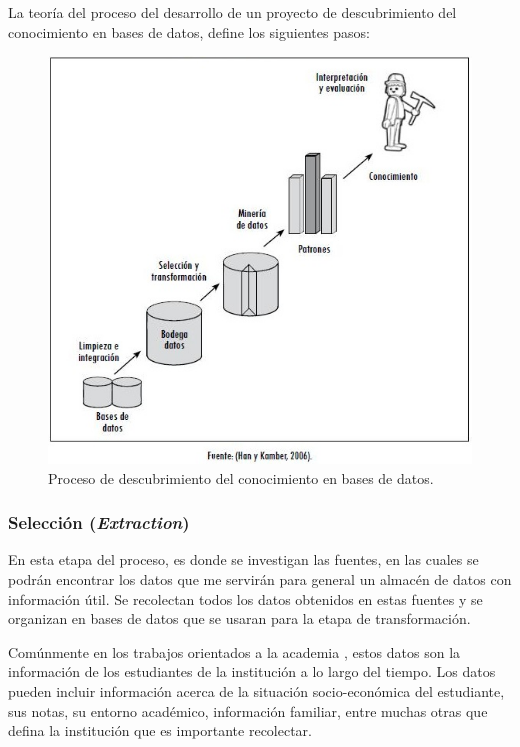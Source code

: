La teoría del proceso del desarrollo de un proyecto de descubrimiento del conocimiento en bases de datos, define los siguientes pasos:
\begin{figure}[H]
\begin{centering}
\includegraphics[scale=0.5]{v13n1a07-3}
\par\end{centering}
\caption{Proceso de descubrimiento del conocimiento en bases de datos.}
\end{figure}
\subsubsection{Selección (\emph{Extraction}) \cite{key-50,key-100}}
En esta etapa del proceso, es donde se investigan las fuentes, en las cuales se podrán encontrar los datos que me servirán para general un almacén de datos con información útil. Se recolectan todos los datos obtenidos en estas fuentes y se organizan en bases de datos que se usaran para la etapa de transformación.

Comúnmente en los trabajos orientados a la academia \cite{key-100, key-110, key-130, key-140}, estos datos son la información de los estudiantes de la institución a lo largo del tiempo. Los datos pueden incluir información acerca de la situación socio-económica del estudiante, sus notas, su entorno académico, información familiar, entre muchas otras que defina la institución que es importante recolectar.

